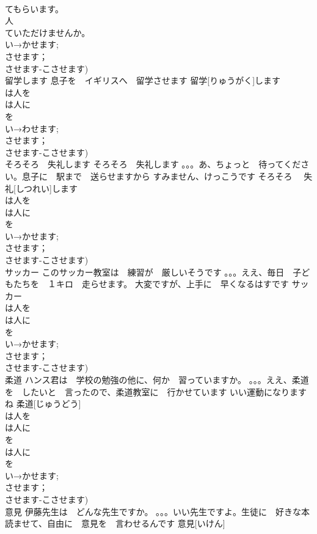 \documentclass[8pt]{extreport}
\begin{document}
\begin{CJK}{UTF8}{min}
\\	てもらいます。
\\	人
\\	ていただけませんか。
\\	い→かせます;
\\	させます；
\\	させます-こさせます)
\\	留学します	息子を　イギリスへ　留学させます	留学[りゅうがく]します			
\\	は人を
\\	は人に
\\	を
\\	い→わせます;
\\	させます；
\\	させます-こさせます)
\\	そろそろ　失礼します	そろそろ　失礼します 。。。あ、ちょっと　待ってください。息子に　駅まで　送らせますから すみません、けっこうです	そろそろ　 失礼[しつれい]します			
\\	は人を
\\	は人に
\\	を
\\	い→かせます;
\\	させます；
\\	させます-こさせます)
\\	サッカー	このサッカー教室は　練習が　厳しいそうです 。。。ええ、毎日　子どもたちを　１キロ　走らせます。 大変ですが、上手に　早くなるはすです	サッカー			
\\	は人を
\\	は人に
\\	を
\\	い→かせます;
\\	させます；
\\	させます-こさせます)
\\	柔道	ハンス君は　学校の勉強の他に、何か　習っていますか。 。。。ええ、柔道を　したいと　言ったので、柔道教室に　行かせています いい運動になりますね	柔道[じゅうどう]			
\\	は人を
\\	は人に
\\	を
\\	は人に
\\	を
\\	い→かせます;
\\	させます；
\\	させます-こさせます)
\\	意見	伊藤先生は　どんな先生ですか。 。。。いい先生ですよ。生徒に　好きな本　読ませて、自由に　意見を　言わせるんです	意見[いけん]				

\end{CJK}
\end{document}

